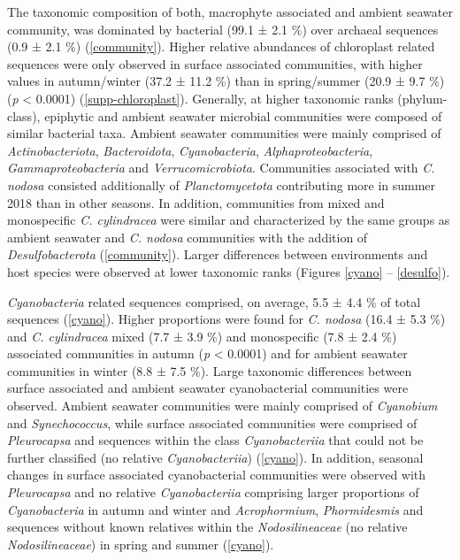 \documentclass[
  12pt,
]{article}
\begin{document}
The taxonomic composition of both, macrophyte associated and ambient
seawater community, was dominated by bacterial (99.1 ± 2.1
\si{\percent}) over archaeal sequences (0.9 ± 2.1 \si{\percent})
(\autoref{community}). Higher relative abundances of chloroplast related
sequences were only observed in surface associated communities, with
higher values in autumn/winter (37.2 ± 11.2 \si{\percent}) than in
spring/summer (20.9 ± 9.7 \si{\percent}) (\emph{p} \textless{} 0.0001)
(\autoref{supp-chloroplast}). Generally, at higher taxonomic ranks
(phylum-class), epiphytic and ambient seawater microbial communities
were composed of similar bacterial taxa. Ambient seawater communities
were mainly comprised of \emph{Actinobacteriota}, \emph{Bacteroidota},
\emph{Cyanobacteria}, \emph{Alphaproteobacteria},
\emph{Gammaproteobacteria} and \emph{Verrucomicrobiota}. Communities
associated with \emph{C. nodosa} consisted additionally of
\emph{Planctomycetota} contributing more in summer 2018 than in other
seasons. In addition, communities from mixed and monospecific \emph{C.
cylindracea} were similar and characterized by the same groups as
ambient seawater and \emph{C. nodosa} communities with the addition of
\emph{Desulfobacterota} (\autoref{community}). Larger differences
between environments and host species were observed at lower taxonomic
ranks (Figures \ref{cyano} -- \ref{desulfo}).

\emph{Cyanobacteria} related sequences comprised, on average, 5.5 ± 4.4
\si{\percent} of total sequences (\autoref{cyano}). Higher proportions
were found for \emph{C. nodosa} (16.4 ± 5.3 \si{\percent}) and \emph{C.
cylindracea} mixed (7.7 ± 3.9 \si{\percent}) and monospecific (7.8 ± 2.4
\si{\percent}) associated communities in autumn (\emph{p} \textless{}
0.0001) and for ambient seawater communities in winter (8.8 ± 7.5
\si{\percent}). Large taxonomic differences between surface associated
and ambient seawater cyanobacterial communities were observed. Ambient
seawater communities were mainly comprised of \emph{Cyanobium} and
\emph{Synechococcus}, while surface associated communities were
comprised of \emph{Pleurocapsa} and sequences within the class
\emph{Cyanobacteriia} that could not be further classified (no relative
\emph{Cyanobacteriia}) (\autoref{cyano}). In addition, seasonal changes
in surface associated cyanobacterial communities were observed with
\emph{Pleurocapsa} and no relative \emph{Cyanobacteriia} comprising
larger proportions of \emph{Cyanobacteria} in autumn and winter and
\emph{Acrophormium}, \emph{Phormidesmis} and sequences without known
relatives within the \emph{Nodosilineaceae} (no relative
\emph{Nodosilineaceae}) in spring and summer (\autoref{cyano}).
\end{document}
